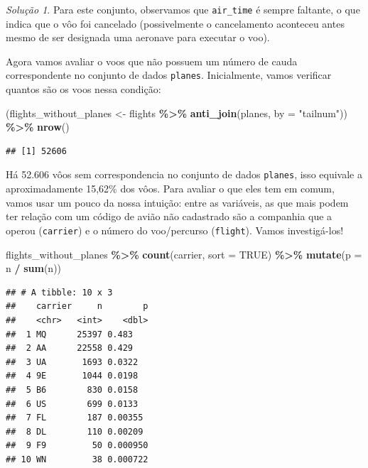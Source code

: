 \documentclass[
]{latex/krantz}
\newenvironment{Shaded}{\begin{snugshade}}{\end{snugshade}}
\newcommand{\AttributeTok}[1]{\textcolor[rgb]{0.13,0.29,0.53}{#1}}
\newcommand{\ConstantTok}[1]{\textcolor[rgb]{0.56,0.35,0.01}{#1}}
\newcommand{\FunctionTok}[1]{\textcolor[rgb]{0.13,0.29,0.53}{\textbf{#1}}}
\newcommand{\NormalTok}[1]{#1}
\newcommand{\OtherTok}[1]{\textcolor[rgb]{0.56,0.35,0.01}{#1}}
\newcommand{\SpecialCharTok}[1]{\textcolor[rgb]{0.81,0.36,0.00}{\textbf{#1}}}
\newcommand{\StringTok}[1]{\textcolor[rgb]{0.31,0.60,0.02}{#1}}
\theoremstyle{definition}
\theoremstyle{definition}
\theoremstyle{definition}
\theoremstyle{definition}
\theoremstyle{remark}
\newtheorem*{solution}{Solução}
\begin{document}
\begin{solution}
Para este conjunto, observamos que \texttt{air\_time} é sempre faltante, o que indica que o vôo foi cancelado (possivelmente o cancelamento aconteceu antes mesmo de ser designada uma aeronave para executar o voo).

Agora vamos avaliar o voos que não possuem um número de cauda correspondente no conjunto de dados \texttt{planes}. Inicialmente, vamos verificar quantos são os voos nessa condição:

\begin{Shaded}
\begin{Highlighting}[]
\NormalTok{(flights\_without\_planes }\OtherTok{\textless{}{-}} 
\NormalTok{  flights }\SpecialCharTok{\%\textgreater{}\%} 
    \FunctionTok{anti\_join}\NormalTok{(planes, }\AttributeTok{by =} \StringTok{"tailnum"}\NormalTok{)) }\SpecialCharTok{\%\textgreater{}\%}
  \FunctionTok{nrow}\NormalTok{()}
\end{Highlighting}
\end{Shaded}

\begin{verbatim}
## [1] 52606
\end{verbatim}

Há 52.606 vôos sem correspondencia no conjunto de dados \texttt{planes}, isso equivale a aproximadamente 15,62\% dos vôos. Para avaliar o que eles tem em comum, vamos usar um pouco da nossa intuição: entre as variáveis, as que mais podem ter relação com um código de avião não cadastrado são a companhia que a operou (\texttt{carrier}) e o número do voo/percurso (\texttt{flight}). Vamos investigá-los!

\begin{Shaded}
\begin{Highlighting}[]
\NormalTok{flights\_without\_planes }\SpecialCharTok{\%\textgreater{}\%}
  \FunctionTok{count}\NormalTok{(carrier, }\AttributeTok{sort =} \ConstantTok{TRUE}\NormalTok{) }\SpecialCharTok{\%\textgreater{}\%}
  \FunctionTok{mutate}\NormalTok{(}\AttributeTok{p =}\NormalTok{ n }\SpecialCharTok{/} \FunctionTok{sum}\NormalTok{(n))}
\end{Highlighting}
\end{Shaded}

\begin{verbatim}
## # A tibble: 10 x 3
##    carrier     n        p
##    <chr>   <int>    <dbl>
##  1 MQ      25397 0.483   
##  2 AA      22558 0.429   
##  3 UA       1693 0.0322  
##  4 9E       1044 0.0198  
##  5 B6        830 0.0158  
##  6 US        699 0.0133  
##  7 FL        187 0.00355 
##  8 DL        110 0.00209 
##  9 F9         50 0.000950
## 10 WN         38 0.000722
\end{verbatim}


\end{solution}
\end{document}
